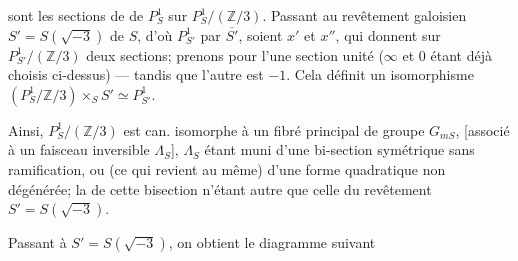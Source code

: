 sont les sections de  de $P^1_S$ sur $P^1_S/(\mathbb Z/3)$. Passant au revêtement galoisien $S'=S(\sqrt{-3})$ de $S$, d'où  $P^1_{S'}$    par $\overline{S'}$, soient $x'$ et $x''$, qui donnent sur $P^1_{S'}/(\mathbb Z/3)$ deux sections; prenons pour l'une   section unité ($\infty$ et $0$ étant déjà choisis ci-dessus) --- tandis que l'autre est $-1$. Cela définit un isomorphisme $(P^1_S/\mathbb Z/3)\times_S S'\simeq P^1_{S'}$.

Ainsi, $P^1_S/(\mathbb Z/3)$ est can. isomorphe à un fibré principal de groupe $G_{mS}$, [associé à un faisceau inversible $\Lambda_S$], $\Lambda_S$ étant muni d'une bi-section  symétrique sans ramification, ou (ce qui revient au même) d'une forme quadratique non dégénérée; la  de cette bisection n'étant autre que celle du revêtement $S'=S(\sqrt{-3})$.

Passant à $S'=S(\sqrt{-3})$, on obtient le diagramme suivant
